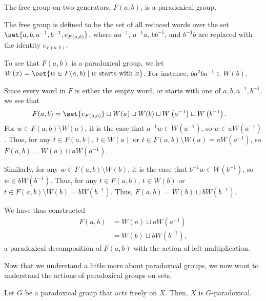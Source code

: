 \begin{example}
  The free group on two generators, $F(a,b)$, is a paradoxical group.\newline

  The free group is defined to be the set of all reduced words over the set $\set{a,b,a^{-1},b^{-1},e_{F(a,b)}}$, where $aa^{-1}$, $a^{-1}a$, $bb^{-1}$, and $b^{-1}b$ are replaced with the identity $e_{F(a,b)}$.\newline

  To see that $F(a,b)$ is a paradoxical group, we let $W(x) = \set{w\in F(a,b)\mid w\text{ starts with }x}$. For instance, $ba^2ba^{-1}\in W(b)$.\newline

  Since every word in $F$ is either the empty word, or starts with one of $a,b,a^{-1},b^{-1}$, we see that
  \begin{align*}
    F(a,b) &= \set{e_{F(a,b)}} \sqcup W(a) \sqcup W(b) \sqcup W\left(a^{-1}\right) \sqcup W\left(b^{-1}\right).
  \end{align*}
  For $w\in F(a,b)\setminus W(a)$, it is the case that $a^{-1}w\in W\left(a^{-1}\right)$, so $w\in aW\left(a^{-1}\right)$. Thus, for any $t\in F(a,b)$, $t\in W(a)$ or $t\in F(a,b)\setminus W(a) = aW\left(a^{-1}\right)$, so $F(a,b) = W(a)\sqcup aW\left(a^{-1}\right)$.

  Similarly, for any $w\in F(a,b)\setminus W(b)$, it is the case that $b^{-1}w\in W\left(b^{-1}\right)$, so $w\in bW\left(b^{-1}\right)$. Thus, for any $t\in F(a,b)$, $t\in W(b)$ or $t\in F(a,b) \setminus W(b) = bW\left(b^{-1}\right)$. Thus, $F(a,b) = W(b)\sqcup bW\left(b^{-1}\right)$.\newline

  We have thus constructed
  \begin{align*}
    F(a,b) &= W(a)\sqcup aW\left(a^{-1}\right)\\
           &= W(b)\sqcup bW\left(b^{-1}\right),
  \end{align*}
  a paradoxical decomposition of $F(a,b)$ with the action of left-multiplication.
\end{example}
Now that we understand a little more about paradoxical groups, we now want to understand the actions of paradoxical groups on sets.
\begin{proposition}
  Let $G$ be a paradoxical group that acts freely on $X$. Then, $X$ is $G$-paradoxical.
\end{proposition}
